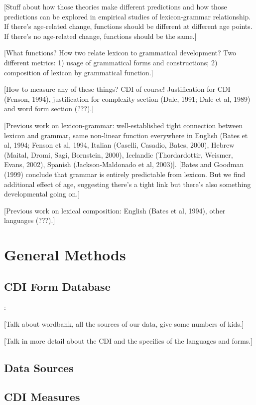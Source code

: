 \documentclass[10pt,letterpaper]{article}
\begin{document}
[Stuff about how those theories make different predictions and how those predictions can be explored in empirical studies of lexicon-grammar relationship. If there's age-related change, functions should be different at different age points. If there's no age-related change, functions should be the same.]

[What functions? How two relate lexicon to grammatical development? Two different metrics: 1) usage of grammatical forms and constructions; 2) composition of lexicon by grammatical function.]

[How to measure any of these things? CDI of course! Justification for CDI (Fenson, 1994), justification for complexity section (Dale, 1991; Dale et al, 1989) and word form section (???).]

[Previous work on lexicon-grammar: well-established tight connection between lexicon and grammar, same non-linear function everywhere in English (Bates et al, 1994; Fenson et al, 1994, Italian (Caselli, Casadio, Bates, 2000), Hebrew (Maital, Dromi, Sagi, Bornstein, 2000), Icelandic (Thordardottir, Weismer, Evans, 2002), Spanish (Jackson-Maldonado et al, 2003)]. [Bates and Goodman (1999) conclude that grammar is entirely predictable from lexicon. But we find additional effect of age, suggesting there's a tight link but there's also something developmental going on.]

[Previous work on lexical composition: English (Bates et al, 1994), other languages (???).]

\clearpage

\section{General Methods}

\subsection{CDI Form Database}:

[Talk about wordbank, all the sources of our data, give some numbers of kids.]

[Talk in more detail about the CDI and the specifics of the languages and forms.]

\subsection{Data Sources}


\subsection{CDI Measures}
\end{document}
